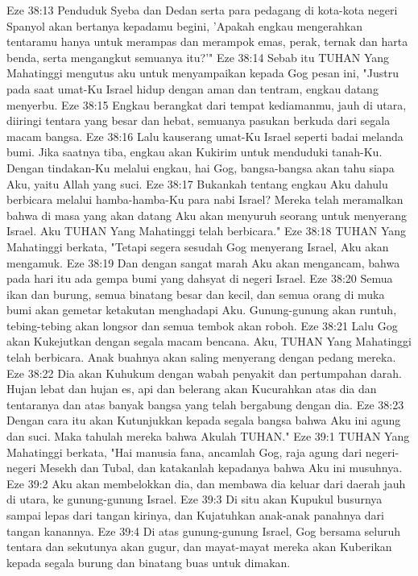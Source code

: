 Eze 38:13  Penduduk Syeba dan Dedan serta para pedagang di kota-kota negeri Spanyol akan bertanya kepadamu begini, 'Apakah engkau mengerahkan tentaramu hanya untuk merampas dan merampok emas, perak, ternak dan harta benda, serta mengangkut semuanya itu?'"
Eze 38:14  Sebab itu TUHAN Yang Mahatinggi mengutus aku untuk menyampaikan kepada Gog pesan ini, "Justru pada saat umat-Ku Israel hidup dengan aman dan tentram, engkau datang menyerbu.
Eze 38:15  Engkau berangkat dari tempat kediamanmu, jauh di utara, diiringi tentara yang besar dan hebat, semuanya pasukan berkuda dari segala macam bangsa.
Eze 38:16  Lalu kauserang umat-Ku Israel seperti badai melanda bumi. Jika saatnya tiba, engkau akan Kukirim untuk menduduki tanah-Ku. Dengan tindakan-Ku melalui engkau, hai Gog, bangsa-bangsa akan tahu siapa Aku, yaitu Allah yang suci.
Eze 38:17  Bukankah tentang engkau Aku dahulu berbicara melalui hamba-hamba-Ku para nabi Israel? Mereka telah meramalkan bahwa di masa yang akan datang Aku akan menyuruh seorang untuk menyerang Israel. Aku TUHAN Yang Mahatinggi telah berbicara."
Eze 38:18  TUHAN Yang Mahatinggi berkata, "Tetapi segera sesudah Gog menyerang Israel, Aku akan mengamuk.
Eze 38:19  Dan dengan sangat marah Aku akan mengancam, bahwa pada hari itu ada gempa bumi yang dahsyat di negeri Israel.
Eze 38:20  Semua ikan dan burung, semua binatang besar dan kecil, dan semua orang di muka bumi akan gemetar ketakutan menghadapi Aku. Gunung-gunung akan runtuh, tebing-tebing akan longsor dan semua tembok akan roboh.
Eze 38:21  Lalu Gog akan Kukejutkan dengan segala macam bencana. Aku, TUHAN Yang Mahatinggi telah berbicara. Anak buahnya akan saling menyerang dengan pedang mereka.
Eze 38:22  Dia akan Kuhukum dengan wabah penyakit dan pertumpahan darah. Hujan lebat dan hujan es, api dan belerang akan Kucurahkan atas dia dan tentaranya dan atas banyak bangsa yang telah bergabung dengan dia.
Eze 38:23  Dengan cara itu akan Kutunjukkan kepada segala bangsa bahwa Aku ini agung dan suci. Maka tahulah mereka bahwa Akulah TUHAN."
Eze 39:1  TUHAN Yang Mahatinggi berkata, "Hai manusia fana, ancamlah Gog, raja agung dari negeri-negeri Mesekh dan Tubal, dan katakanlah kepadanya bahwa Aku ini musuhnya.
Eze 39:2  Aku akan membelokkan dia, dan membawa dia keluar dari daerah jauh di utara, ke gunung-gunung Israel.
Eze 39:3  Di situ akan Kupukul busurnya sampai lepas dari tangan kirinya, dan Kujatuhkan anak-anak panahnya dari tangan kanannya.
Eze 39:4  Di atas gunung-gunung Israel, Gog bersama seluruh tentara dan sekutunya akan gugur, dan mayat-mayat mereka akan Kuberikan kepada segala burung dan binatang buas untuk dimakan.
